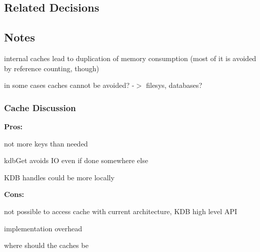 \subsection*{Related Decisions}

\subsection*{Notes}

internal caches lead to duplication of memory consumption (most of it is avoided by reference counting, though)

in some cases caches cannot be avoided? -\/$>$ filesys, databases?

\subsubsection*{Cache Discussion}

{\bfseries Pros\+:}


\begin{DoxyItemize}
\item not more keys than needed
\item kdb\+Get avoids IO even if done somewhere else
\item K\+DB handles could be more locally
\end{DoxyItemize}

{\bfseries Cons\+:}


\begin{DoxyItemize}
\item not possible to access cache with current architecture, K\+DB high level A\+PI
\item implementation overhead
\item where should the caches be 
\end{DoxyItemize}